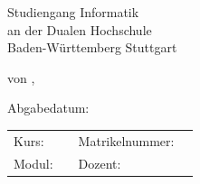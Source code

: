 \documentclass[12pt]{report}
\begin{document}
 
	\begin{titlepage}
		\thispagestyle{titlepage}
		\newcommand\HRule{\rule{\textwidth}{1pt}} %

		
		\begin{center}
			
			\vspace*{2cm}
			
			\begin{spacing}{2}
				{ \huge \bfseries \MakeUppercase{\meinTitel}}
			\end{spacing}
			
			\vspace*{1.5cm}
			
			\Large \artDerArbeit
			
			\vspace*{3cm}
			
			{\LARGE Studiengang Informatik}\\
			{\LARGE an der Dualen Hochschule}\\
			{\LARGE Baden-Württemberg Stuttgart}\\

			\vspace*{2.5cm}
			
			\Large von \meinNameA , \meinNameS
			
			\vspace*{1.5cm}
			
			\Large Abgabedatum: \abgabeDatum

			\begin{table}[bp]
				\begin{tabular}{l l l l}
					Kurs: & \meinKurs & Matrikelnummer: & \meineMatrikelNr  \\
					Modul: & \modul & Dozent: & \dozent\\
				\end{tabular}
			\end{table}
			
			
		\end{center}
		
	\end{titlepage}



\fancypagestyle{plain}{
	\fancyfoot[L]{\meinNameA\\
		 \meinNameS\\
		 \meinKurs}
	\fancyfoot[C]{Seite \thepage\ }%
	\fancyfoot[R]{\abgabeDatum}
}
\end{document}
